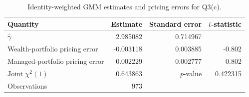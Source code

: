 \begin{table}[htbp]
\centering
\caption{Identity-weighted GMM estimates and pricing errors for Q3(c).}
\label{tab:q3c-results}
\begin{tabular}{lrrr}
\hline
Quantity & Estimate & Standard error & $t$-statistic \\
\hline
$\widehat{\gamma}$ & 2.985082 & 0.714967 & \\
Wealth-portfolio pricing error & -0.003118 & 0.003885 & -0.802 \\
Managed-portfolio pricing error & 0.002229 & 0.002777 & 0.802 \\
\hline
Joint $\chi^2(1)$ & 0.643863 & $p$-value & 0.422315 \\
Observations & 973 & & \\
\hline
\end{tabular}
\end{table}
